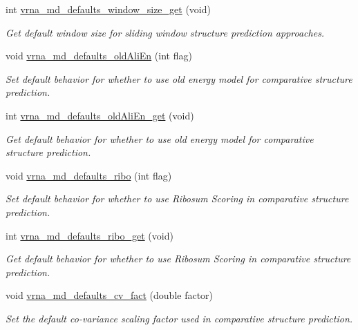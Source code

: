 \begin{DoxyCompactItemize}
int \mbox{\hyperlink{group__model__details_ga670146a9aa3ba77f4d422d60b7c30ac9}{vrna\+\_\+md\+\_\+defaults\+\_\+window\+\_\+size\+\_\+get}} (void)
\begin{DoxyCompactList}\small\item\em Get default window size for sliding window structure prediction approaches. \end{DoxyCompactList}\item 
void \mbox{\hyperlink{group__model__details_ga41521d5b9fb7e0f31e7ea73f5792afab}{vrna\+\_\+md\+\_\+defaults\+\_\+old\+Ali\+En}} (int flag)
\begin{DoxyCompactList}\small\item\em Set default behavior for whether to use old energy model for comparative structure prediction. \end{DoxyCompactList}\item 
int \mbox{\hyperlink{group__model__details_ga2374492b5019df88022fe4c05f0f3630}{vrna\+\_\+md\+\_\+defaults\+\_\+old\+Ali\+En\+\_\+get}} (void)
\begin{DoxyCompactList}\small\item\em Get default behavior for whether to use old energy model for comparative structure prediction. \end{DoxyCompactList}\item 
void \mbox{\hyperlink{group__model__details_ga937c45e1d06fd6168730a9b08d130be3}{vrna\+\_\+md\+\_\+defaults\+\_\+ribo}} (int flag)
\begin{DoxyCompactList}\small\item\em Set default behavior for whether to use Ribosum Scoring in comparative structure prediction. \end{DoxyCompactList}\item 
int \mbox{\hyperlink{group__model__details_ga169027f0c0561ea7d87b655e4b336bfc}{vrna\+\_\+md\+\_\+defaults\+\_\+ribo\+\_\+get}} (void)
\begin{DoxyCompactList}\small\item\em Get default behavior for whether to use Ribosum Scoring in comparative structure prediction. \end{DoxyCompactList}\item 
void \mbox{\hyperlink{group__model__details_gad3a3f40baafd91a6ce80a91a68e20053}{vrna\+\_\+md\+\_\+defaults\+\_\+cv\+\_\+fact}} (double factor)
\begin{DoxyCompactList}\small\item\em Set the default co-\/variance scaling factor used in comparative structure prediction. \end{DoxyCompactList}\item 

\end{DoxyCompactItemize}
